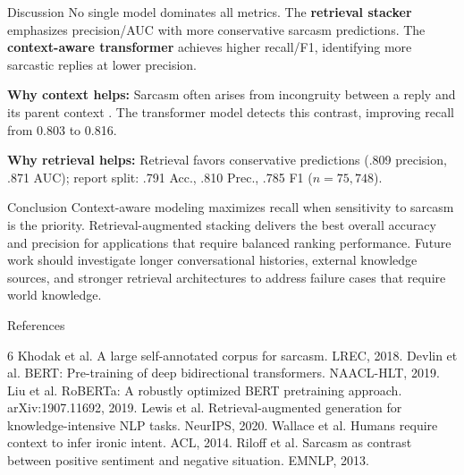 \documentclass[final, 12pt]{beamer}
\newlength{\colwidth}
\newcommand{\key}[1]{\textbf{\textcolor{accentpurple}{#1}}}
\begin{document}
\begin{frame}[t]
\begin{columns}[t,totalwidth=\textwidth]
\begin{column}{\colwidth}
  \vspace{-0.5cm}

  \begin{block}{Discussion}
    No single model dominates all metrics. The \key{retrieval stacker} emphasizes precision/AUC with more conservative sarcasm predictions. The \key{context-aware transformer} achieves higher recall/F1, identifying more sarcastic replies at lower precision.
    
    \textbf{Why context helps:} Sarcasm often arises from incongruity between a reply and its parent context \cite{wallace2014humans,riloff2013sarcasm}. The transformer model detects this contrast, improving recall from 0.803 to 0.816.
    
    \textbf{Why retrieval helps:} Retrieval favors conservative predictions (.809 precision, .871 AUC); report split: .791 Acc., .810 Prec., .785 F1 (\(n=75{,}748\)).
  \end{block}
  \vspace{0.2cm}

  \begin{alertblock}{Conclusion}
    Context-aware modeling maximizes recall when sensitivity to sarcasm is the priority. Retrieval-augmented stacking delivers the best overall accuracy and precision for applications that require balanced ranking performance. Future work should investigate longer conversational histories, external knowledge sources, and stronger retrieval architectures to address failure cases that require world knowledge.
  \end{alertblock}

  \begin{block}{References}
      \vspace{-0.05cm}
    \fontsize{8.6}{9.4}\selectfont\raggedright
    \begin{thebibliography}{6}
       Khodak et al. A large self-annotated corpus for sarcasm. LREC, 2018.
       Devlin et al. BERT: Pre-training of deep bidirectional transformers. NAACL-HLT, 2019.
       Liu et al. RoBERTa: A robustly optimized BERT pretraining approach. arXiv:1907.11692, 2019.
       Lewis et al. Retrieval-augmented generation for knowledge-intensive NLP tasks. NeurIPS, 2020.
       Wallace et al. Humans require context to infer ironic intent. ACL, 2014.
       Riloff et al. Sarcasm as contrast between positive sentiment and negative situation. EMNLP, 2013.
    \end{thebibliography}
  \end{block}

\end{column}

\end{columns}
\end{frame}
\end{document}
